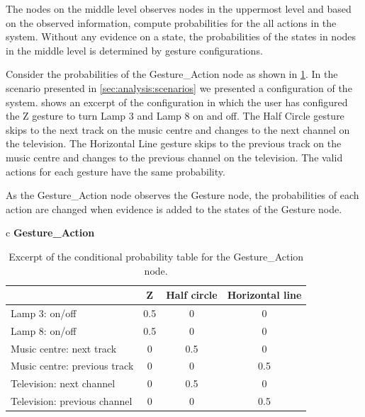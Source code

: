 The nodes on the middle level observes nodes in the uppermost level and based on the observed information, compute probabilities for the all actions in the system. Without any evidence on a state, the probabilities of the states in nodes in the middle level is determined by gesture configurations.

Consider the probabilities of the Gesture\_Action node as shown in \cref{tbl:design:bayesian-network:cpt-gesture-action}. In the scenario presented in \cref{sec:analysis:scenarios} we presented a configuration of the system.  shows an excerpt of the configuration in which the user has configured the Z gesture to turn Lamp 3 and Lamp 8 on and off. The Half Circle gesture skips to the next track on the music centre and changes to the next channel on the television. The Horizontal Line gesture skips to the previous track on the music centre and changes to the previous channel on the television. The valid actions for each gesture have the same probability.

As the Gesture\_Action node observes the Gesture node, the probabilities of each action are changed when evidence is added to the states of the Gesture node.

\begin{table}[h!]
\centering
\caption{Excerpt of the conditional probability table for the Gesture\_Action node.}
\label{tbl:design:bayesian-network:cpt-gesture-action}
\begin{tabular}{c}
\textbf{Gesture\_Action}   \\
\begin{tabular}{l|ccc}
                             & Z   & Half circle & Horizontal line \\ \hline
Lamp 3: on/off               & 0.5 & 0             & 0                \\
Lamp 8: on/off               & 0.5 & 0             & 0                \\
Music centre: next track     & 0   & 0.5             & 0                \\
Music centre: previous track & 0   & 0             & 0.5              \\
Television: next channel     & 0   & 0.5             & 0                \\
Television: previous channel & 0   & 0             & 0.5              
\end{tabular}
\end{tabular}
\end{table}

